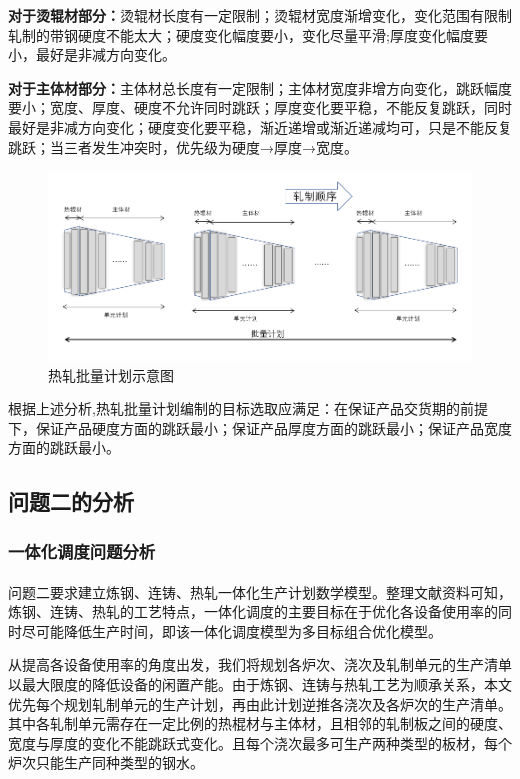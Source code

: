 \documentclass{whutmod}
\newcommand{\upcite}[1]{\textsuperscript{\cite{#1}}}
\begin{document}
\textbf{对于烫辊材部分：}烫辊材长度有一定限制；烫辊材宽度渐增变化，变化范围有限制轧制的带钢硬度不能太大；硬度变化幅度要小，变化尽量平滑;厚度变化幅度要小，最好是非减方向变化。

\textbf{对于主体材部分：}主体材总长度有一定限制；主体材宽度非增方向变化，跳跃幅度要小；宽度、厚度、硬度不允许同时跳跃；厚度变化要平稳，不能反复跳跃，同时最好是非减方向变化；硬度变化要平稳，渐近递增或渐近递减均可，只是不能反复跳跃；当三者发生冲突时，优先级为硬度→厚度→宽度。
\begin{figure}[H]
\centering
\includegraphics[width=1\textwidth]{figures/asdad.png}
\caption{热轧批量计划示意图}\label{11sssss11}
\end{figure}

根据上述分析,热轧批量计划编制的目标选取应满足：在保证产品交货期的前提下，保证产品硬度方面的跳跃最小；保证产品厚度方面的跳跃最小；保证产品宽度方面的跳跃最小。

\subsection{问题二的分析}
\subsubsection{一体化调度问题分析}
问题二要求建立炼钢、连铸、热轧一体化生产计划数学模型。整理文献资料可知\upcite{1,2,3}，炼钢、连铸、热轧的工艺特点，一体化调度的主要目标在于优化各设备使用率的同时尽可能降低生产时间，即该一体化调度模型为多目标组合优化模型。

从提高各设备使用率的角度出发，我们将规划各炉次、浇次及轧制单元的生产清单以最大限度的降低设备的闲置产能。由于炼钢、连铸与热轧工艺为顺承关系，本文优先每个规划轧制单元的生产计划，再由此计划逆推各浇次及各炉次的生产清单。其中各轧制单元需存在一定比例的热棍材与主体材，且相邻的轧制板之间的硬度、宽度与厚度的变化不能跳跃式变化。且每个浇次最多可生产两种类型的板材，每个炉次只能生产同种类型的钢水。
\end{document}
